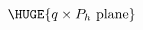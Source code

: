 \documentclass[12pt]{article}
\begin{document}
\begin{equation*}
\HUGE{q\times P_h~\text{plane}}
\end{equation*}
\end{document}
